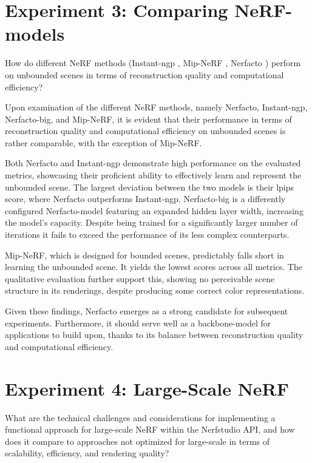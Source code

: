 \section{Experiment 3: Comparing NeRF-models}
\begin{description}[leftmargin=!,labelwidth=\widthof{RQ 1:}]
\item[\textbf{RQ 3:}] How do different NeRF methods (Instant-ngp \cite{muller_instant_2022}, Mip-NeRF \cite{barron_mip-nerf_2021}, Nerfacto \cite{tancik_nerfstudio_2023}) perform on unbounded scenes in terms of reconstruction quality and computational efficiency?
\end{description}

Upon examination of the different NeRF methods, namely Nerfacto, Instant-ngp, Nerfacto-big, and Mip-NeRF, it is evident that their performance in terms of reconstruction quality and computational efficiency on unbounded scenes is rather comparable, with the exception of Mip-NeRF.

Both Nerfacto and Instant-ngp demonstrate high performance on the evaluated metrics, showcasing their proficient ability to effectively learn and represent the unbounded scene. The largest deviation between the two models is their \acrshort{lpips} score, where Nerfacto outperforms Instant-ngp. Nerfacto-big is a differently configured Nerfacto-model featuring an expanded hidden layer width, increasing the model's capacity. Despite being trained for a significantly larger number of iterations it fails to exceed the performance of its less complex counterparts.

Mip-NeRF, which is designed for bounded scenes, predictably falls short in learning the unbounded scene. It yields the lowest scores across all metrics. The qualitative evaluation further support this, showing no perceivable scene structure in its renderings, despite producing some correct color representations.

Given these findings, Nerfacto emerges as a strong candidate for subsequent experiments. Furthermore, it should serve well as a backbone-model for applications to build upon, thanks to its balance between reconstruction quality and computational efficiency.



\section{Experiment 4: Large-Scale NeRF}
\begin{description}[leftmargin=!,labelwidth=\widthof{RQ 1:}]
\item[\textbf{RQ 4:}] What are the technical challenges and considerations for implementing a functional approach for large-scale NeRF within the Nerfstudio API, and how does it compare to approaches not optimized for large-scale in terms of scalability, efficiency, and rendering quality?
\end{description}

